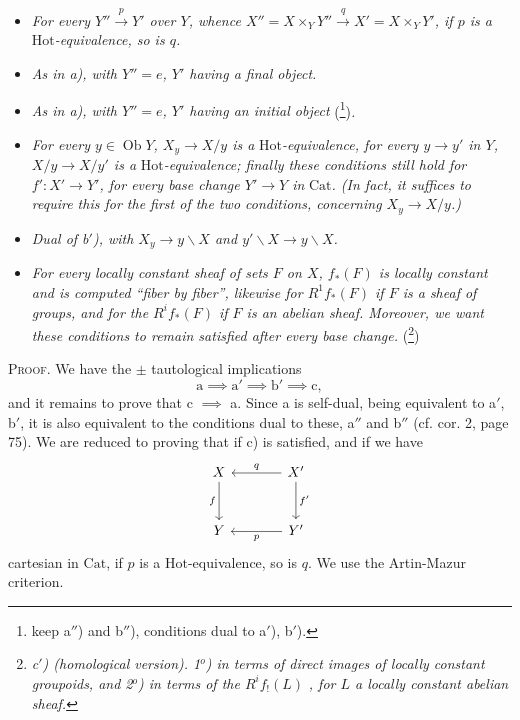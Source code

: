 \documentclass[11pt]{article}
\newcommand{\printedpage}[1]{\marginpar{\footnotesize p.~#1}}
\newcommand{\Hot}{\mathrm{Hot}}
\newcommand{\Cat}{\mathrm{Cat}}
\newcommand{\Ob}{\operatorname{Ob}}
\begin{document}
\begin{itemize}[leftmargin=3em]
\item[\textit{a)}] \textit{For every $Y'' \xrightarrow{p} Y'$ over $Y$, whence $X'' = X \times_Y Y'' \xrightarrow{q} X' = X \times_Y Y'$, if $p$ is a} $\Hot$\textit{-equivalence, so is $q$.}

\item[\textit{a$'$)}] \textit{As in a), with $Y'' = e$, $Y'$ having a final object.}

\item[\textit{a$''$)}] \textit{As in a), with $Y'' = e$, $Y'$ having an initial object} (\footnote{keep a$''$) and b$''$), conditions dual to a$'$), b$'$).})\textit{.}

\item[\textit{b$'$)}] \textit{For every $y \in \Ob Y$, $X_y \longrightarrow X/y$ is a} $\Hot$\textit{-equivalence, for every $y \longrightarrow y'$ in $Y$, $X/y \longrightarrow X/y'$ is a} $\Hot$\textit{-equivalence; finally these conditions still hold for $f' : X' \longrightarrow Y'$, for every base change $Y' \longrightarrow Y$ in} $\Cat$\textit{. (In fact, it suffices to require this for the first of the two conditions, concerning $X_y \longrightarrow X/y$.)}

\item[\textit{b$''$)}] \textit{Dual of b$'$), with $X_y \longrightarrow y\backslash X$ and $y'\backslash X \longrightarrow y\backslash X$.}

\item[\textit{c)}] \textit{For every locally constant sheaf of sets $F$ on $X$, $f_*(F)$ is locally constant and is computed ``fiber by fiber'', likewise for $R^1 f_*(F)$ if $F$ is a sheaf of groups, and for the $R^i f_*(F)$ if $F$ is an abelian sheaf. Moreover, we want these conditions to remain satisfied after every base change.} (\footnote{\textit{c$'$) (homological version). 1$^o$) in terms of direct images of locally constant groupoids, and 2$^o$) in terms of the $R^i f_!(L)$} \textit{, for $L$ a locally constant abelian sheaf.}})
\end{itemize}

\noindent\textsc{Proof}. We have the $\pm$ tautological implications
\[
\mathrm{a} \implies \mathrm{a}' \implies \mathrm{b}' \implies \mathrm{c},
\]
and it remains to prove that c $\implies$ a. Since a is self-dual, being equivalent to a$'$, b$'$, it is also equivalent to the conditions dual to these, a$''$ and b$''$ (cf. cor. 2, page 75). We are reduced to proving that if c) is satisfied, and if we have
\[
\begin{tikzcd}[row sep=large, column sep=large]
X \arrow[d, "f"'] & X' \arrow[l, "q"'] \arrow[d, "f'"] \\
Y & Y' \arrow[l, "p"]
\end{tikzcd}
\]
\printedpage{2}
cartesian in $\Cat$, if $p$ is a $\Hot$-equivalence, so is $q$. We use the Artin-Mazur criterion.
\end{document}
